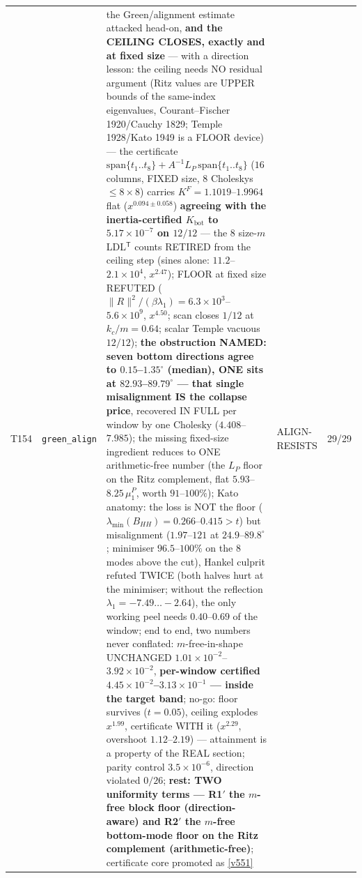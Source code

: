 \documentclass[11pt,a4paper]{article}
\begin{document}
{\begin{xltabular}{\linewidth}{@{}p{0.95cm} >{\raggedright\arraybackslash}p{3.1cm} Y >{\raggedright\scriptsize\arraybackslash}p{3.35cm} p{1.15cm}@{}}
T154 & \texttt{\scriptsize green\_\allowbreak align} & the Green/alignment estimate attacked head-on, \textbf{and the CEILING CLOSES, exactly and at fixed size} --- with a direction lesson: the ceiling needs NO residual argument (Ritz values are UPPER bounds of the same-index eigenvalues, Courant--Fischer 1920/Cauchy 1829; Temple 1928/Kato 1949 is a FLOOR device) --- the certificate $\mathrm{span}\{t_1..t_8\}+A^{-1}L_P\,\mathrm{span}\{t_1..t_8\}$ ($16$ columns, FIXED size, $8$ Choleskys $\le8\times8$) carries $K^F=1.1019$--$1.9964$ flat ($x^{0.094\pm0.058}$) \textbf{agreeing with the inertia-certified $K_{\mathrm{bot}}$ to $5.17\times10^{-7}$ on $12/12$} --- the $8$ size-$m$ LDL$^{\mathsf T}$ counts RETIRED from the ceiling step (sines alone: $11.2$--$2.1\times10^{4}$, $x^{2.47}$); FLOOR at fixed size REFUTED ($\|R\|^2/(\beta\lambda_1)=6.3\times10^{3}$--$5.6\times10^{9}$, $x^{4.50}$; scan closes $1/12$ at $k_c/m=0.64$; scalar Temple vacuous $12/12$); \textbf{the obstruction NAMED: seven bottom directions agree to $0.15$--$1.35^\circ$ (median), ONE sits at $82.93$--$89.79^\circ$ --- that single misalignment IS the collapse price}, recovered IN FULL per window by one Cholesky ($4.408$--$7.985$); the missing fixed-size ingredient reduces to ONE arithmetic-free number (the $L_P$ floor on the Ritz complement, flat $5.93$--$8.25\,\mu^P_1$, worth $91$--$100\%$); Kato anatomy: the loss is NOT the floor ($\lambda_{\min}(B_{HH})=0.266$--$0.415>t$) but misalignment ($1.97$--$121$ at $24.9$--$89.8^\circ$; minimiser $96.5$--$100\%$ on the $8$ modes above the cut), Hankel culprit refuted TWICE (both halves hurt at the minimiser; without the reflection $\lambda_1=-7.49\ldots-2.64$), the only working peel needs $0.40$--$0.69$ of the window; end to end, two numbers never conflated: $m$-free-in-shape UNCHANGED $1.01\times10^{-2}$--$3.92\times10^{-2}$, \textbf{per-window certified $4.45\times10^{-2}$--$3.13\times10^{-1}$ --- inside the target band}; no-go: floor survives ($t=0.05$), ceiling explodes $x^{1.99}$, certificate WITH it ($x^{2.29}$, overshoot $1.12$--$2.19$) --- attainment is a property of the REAL section; parity control $3.5\times10^{-6}$, direction violated $0/26$; \textbf{rest: TWO uniformity terms --- R1$'$ the $m$-free block floor (direction-aware) and R2$'$ the $m$-free bottom-mode floor on the Ritz complement (arithmetic-free)}; certificate core promoted as \vref{v551} & ALIGN-RESISTS & 29/29\\

\end{xltabular}}
\end{document}
